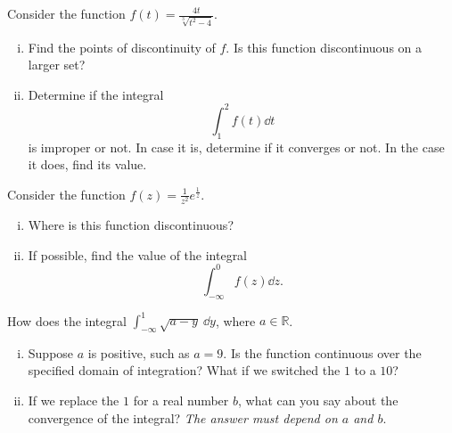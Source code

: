 \documentclass[12pt]{article}
\theoremstyle{plain}
\theoremstyle{definition}
\theoremstyle{remark}
\newcommand{\bR}{\mathbb{R}}        %
\renewcommand{\:}{\colon}           %
\renewcommand{\.}{\Cdot}                %
\begin{document}
\begin{multicols}{2}
  \begin{ptcbP}
    Consider the function $f(t)=\frac{4t}{\sqrt[3]{t^2-4}}$.\vspace*{-0.5em}
    \begin{enumerate}[i)]
      \itemsep=-0.4em
      \item Find the points of discontinuity of $f$. Is this function discontinuous on a larger set?
      \item Determine if the integral 
      $$\int_1^2f(t)\dd t$$
      is improper or not. In case it is, determine if it converges or not. In the case it does, find its value.
    \end{enumerate}
  \end{ptcbP}

  \begin{ptcbP}
    Consider the function $f(z)=\frac{1}{z^2}e^{\frac{1}{z}}$.
    \vspace*{-0.5em}
    \begin{enumerate}[i)]
      \itemsep=-0.4em
      \item Where is this function discontinuous?
      \item If possible, find the value of the integral 
      $$\int_{-\infty}^0f(z)\dd z.$$
    \end{enumerate}
  \end{ptcbP}

  \begin{ptcbP}
    How does the integral $\displaystyle\int_{-\infty}^{1}{\sqrt{a-y}}\ \dd y$, where $a\in\bR$.\vspace*{-0.5em}
    \begin{enumerate}[i)]
      \itemsep=-0.4em
      \item Suppose $a$ is positive, such as $a=9$. Is the function continuous over the specified domain of integration? What if we switched the $1$ to a $10$?
      \item If we replace the $1$ for a real number $b$, what can you say about the convergence of the integral? \emph{The answer must depend on $a$ and $b$}. 
    \end{enumerate}
  \end{ptcbP}

\end{multicols}
\end{document}
